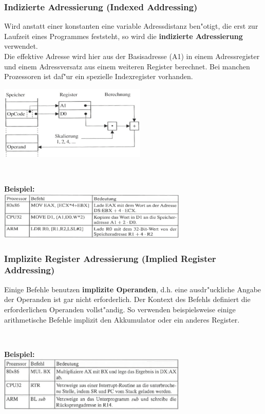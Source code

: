 \subsubsection{Indizierte Adressierung (Indexed Addressing)}
Wird anstatt einer konstanten eine variable Adressdistanz ben"otigt, die erst zur Laufzeit eines Programmes feststeht, so wird die \textbf{indizierte Adressierung} verwendet.\\
Die effektive Adresse wird hier aus der Basisadresse (A1) in einem Adressregister und einem Adressversatz aus einem weiteren Register berechnet. Bei manchen Prozessoren ist daf"ur ein spezielle Indexregister vorhanden.

\begin{minipage}{7cm}
	\includegraphics[width=7cm]{pics/Indizierte-Adressierung}
\end{minipage}
%
\begin{minipage}{0.5cm}
	\ \
\end{minipage}
%
\begin{minipage}{9cm}
	\textbf{Beispiel:}\\
	\includegraphics[width=9cm]{pics/Indizierte-Adressierung-Bsp}
\end{minipage}

\subsubsection{Implizite Register Adressierung (Implied Register Addressing)}
\begin{minipage}{9cm}
	Einige Befehle benutzen \textbf{implizite Operanden}, d.h. eine ausdr"uckliche Angabe der Operanden ist gar nicht erforderlich. Der Kontext des Befehls definiert die erforderlichen Operanden vollst"andig.  So verwenden beispielsweise einige arithmetische Befehle implizit den Akkumulator oder ein anderes Register.
\end{minipage}
%
\begin{minipage}{0.5cm}
	\ \
\end{minipage}
%
\begin{minipage}{9cm}
	\textbf{Beispiel:}\\
	\includegraphics[width=9cm]{pics/Implizite-Register-Adressierung-Bsp}
\end{minipage}

